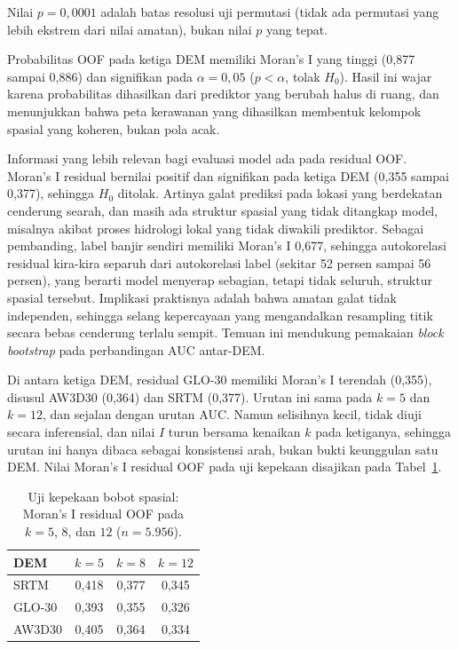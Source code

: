 \documentclass[12pt,a4paper]{article}
\begin{document}
Nilai $p=0{,}0001$ adalah batas resolusi uji permutasi (tidak ada permutasi
yang lebih ekstrem dari nilai amatan), bukan nilai $p$ yang tepat.

Probabilitas OOF pada ketiga DEM memiliki Moran's I yang tinggi (0,877 sampai
0,886) dan signifikan pada $\alpha=0{,}05$ ($p<\alpha$, tolak $H_0$). Hasil
ini wajar karena probabilitas dihasilkan dari prediktor yang berubah halus di
ruang, dan menunjukkan bahwa peta kerawanan yang dihasilkan membentuk
kelompok spasial yang koheren, bukan pola acak.

Informasi yang lebih relevan bagi evaluasi model ada pada residual OOF.
Moran's I residual bernilai positif dan signifikan pada ketiga DEM (0,355
sampai 0,377), sehingga $H_0$ ditolak. Artinya galat prediksi pada lokasi
yang berdekatan cenderung searah, dan masih ada struktur spasial yang tidak
ditangkap model, misalnya akibat proses hidrologi lokal yang tidak diwakili
prediktor. Sebagai pembanding, label banjir sendiri memiliki Moran's I 0,677,
sehingga autokorelasi residual kira-kira separuh dari autokorelasi label
(sekitar 52 persen sampai 56 persen), yang berarti model menyerap sebagian,
tetapi tidak seluruh, struktur spasial tersebut. Implikasi praktisnya adalah
bahwa amatan galat tidak independen, sehingga selang kepercayaan yang
mengandalkan resampling titik secara bebas cenderung terlalu sempit. Temuan
ini mendukung pemakaian \textit{block bootstrap} pada perbandingan AUC
antar-DEM.

Di antara ketiga DEM, residual GLO-30 memiliki Moran's I terendah (0,355),
disusul AW3D30 (0,364) dan SRTM (0,377). Urutan ini sama pada $k=5$ dan
$k=12$, dan sejalan dengan urutan AUC. Namun selisihnya kecil, tidak diuji
secara inferensial, dan nilai $I$ turun bersama kenaikan $k$ pada ketiganya,
sehingga urutan ini hanya dibaca sebagai konsistensi arah, bukan bukti
keunggulan satu DEM. Nilai Moran's I residual OOF pada uji kepekaan disajikan
pada Tabel~\ref{tab:moran-kek}.

\begin{table}[!htbp]
\centering
\caption[Uji kepekaan bobot spasial Moran's I residual OOF]{Uji kepekaan bobot spasial: Moran's I residual OOF pada $k=5$, $8$,
dan $12$ ($n=5.956$).}
\label{tab:moran-kek}
\begin{tabular}{lccc}
\toprule
\textbf{DEM} & \textbf{$k=5$} & \textbf{$k=8$} & \textbf{$k=12$} \\
\midrule
SRTM   & 0,418 & 0,377 & 0,345 \\
GLO-30 & 0,393 & 0,355 & 0,326 \\
AW3D30 & 0,405 & 0,364 & 0,334 \\
\bottomrule
\end{tabular}
\end{table}
\end{document}
